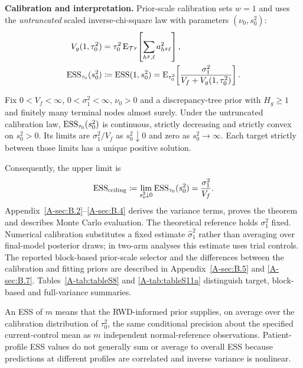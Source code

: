 \documentclass[11pt]{article}
\begin{document}
\noindent\textbf{Calibration and interpretation.}
Prior-scale calibration sets $w=1$ and uses the \emph{untruncated} scaled inverse-chi-square law with parameters $(\nu_0,s_0^2)$:
\begin{equation}\label{eq:essspike}
\begin{aligned}
V_g(1,\tau_0^2)
&=\tau_0^2\operatorname{E}_{\mathcal T^g}\!\left[\sum_{h^g,\ell}a_{h^g\ell}^2\right],\\
\operatorname{ESS}_{\tau_0}(s_0^2)
&\coloneqq\operatorname{ESS}(1,s_0^2)
=\operatorname{E}_{\tau_0^2}\!\left[\frac{\sigma_{1}^2}{V_f+V_g(1,\tau_0^2)}\right].
\end{aligned}
\end{equation}
\begin{theorem}\label{thm:ess}
Fix $0<V_f<\infty$, $0<\sigma_{1}^2<\infty$, $\nu_0>0$ and a discrepancy-tree prior with $H_g\geq1$ and finitely many terminal nodes almost surely. Under the untruncated calibration law, $\operatorname{ESS}_{\tau_0}(s_0^2)$ is continuous, strictly decreasing and strictly convex on $s_0^2>0$. Its limits are $\sigma_{1}^2/V_f$ as $s_0^2\downarrow0$ and zero as $s_0^2\to\infty$. Each target strictly between those limits has a unique positive solution.
\end{theorem}
Consequently, the upper limit is
\begin{equation}\label{eq:ceiling}
\operatorname{ESS}_{\mathrm{ceiling}}\coloneqq \lim_{s_0^2\downarrow0}\operatorname{ESS}_{\tau_0}(s_0^2)=\frac{\sigma_{1}^2}{V_f}.
\end{equation}
Appendix~\ref{A-sec:B.2}--\ref{A-sec:B.4} derives the variance terms, proves the theorem and describes Monte Carlo evaluation. The theoretical reference holds $\sigma_{1}^2$ fixed. Numerical calibration substitutes a fixed estimate $\widehat\sigma_{1}^2$ rather than averaging over final-model posterior draws; in two-arm analyses this estimate uses trial controls. The reported block-based prior-scale selector and the differences between the calibration and fitting priors are described in Appendix~\ref{A-sec:B.5} and \ref{A-sec:B.7}. Tables~\ref{A-tab:tableS8} and \ref{A-tab:tableS11a} distinguish target, block-based and full-variance summaries.

An ESS of $m$ means that the RWD-informed prior supplies, on average over the calibration distribution of $\tau_0^2$, the same conditional precision about the specified current-control mean as $m$ independent normal-reference observations. Patient-profile ESS values do not generally sum or average to overall ESS because predictions at different profiles are correlated and inverse variance is nonlinear.
\end{document}
